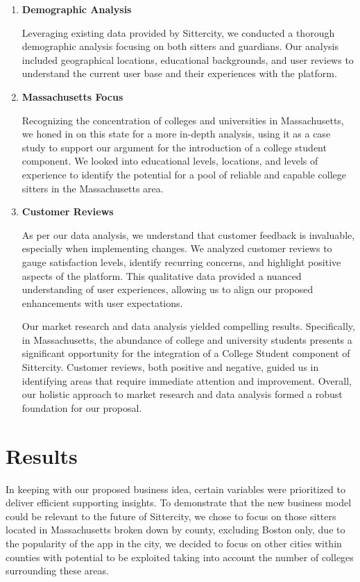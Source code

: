 \documentclass[12pt]{article}
\begin{document}
\begin{enumerate}
\def\labelenumi{\arabic{enumi}.}
\item
  \textbf{Demographic Analysis}

  Leveraging existing data provided by Sittercity, we conducted a
  thorough demographic analysis focusing on both sitters and guardians.
  Our analysis included geographical locations, educational backgrounds,
  and user reviews to understand the current user base and their
  experiences with the platform.
\item
  \textbf{Massachusetts Focus}

  Recognizing the concentration of colleges and universities in
  Massachusetts, we honed in on this state for a more in-depth analysis,
  using it as a case study to support our argument for the introduction
  of a college student component. We looked into educational levels,
  locations, and levels of experience to identify the potential for a
  pool of reliable and capable college sitters in the Massachusetts
  area.
\item
  \textbf{Customer Reviews}

  As per our data analysis, we understand that customer feedback is
  invaluable, especially when implementing changes. We analyzed customer
  reviews to gauge satisfaction levels, identify recurring concerns, and
  highlight positive aspects of the platform. This qualitative data
  provided a nuanced understanding of user experiences, allowing us to
  align our proposed enhancements with user expectations.

  Our market research and data analysis yielded compelling results.
  Specifically, in Massachusetts, the abundance of college and
  university students presents a significant opportunity for the
  integration of a College Student component of Sittercity. Customer
  reviews, both positive and negative, guided us in identifying areas
  that require immediate attention and improvement. Overall, our
  holistic approach to market research and data analysis formed a robust
  foundation for our proposal.
\end{enumerate}

\newpage

\hypertarget{results}{%
\section{\texorpdfstring{\textbf{Results}}{Results}}\label{results}}

In keeping with our proposed business idea, certain variables were
prioritized to deliver efficient supporting insights. To demonstrate
that the new business model could be relevant to the future of
Sittercity, we chose to focus on those sitters located in Massachusetts
broken down by county, excluding Boston only, due to the popularity of
the app in the city, we decided to focus on other cities within counties
with potential to be exploited taking into account the number of
colleges surrounding these areas.
\end{document}
